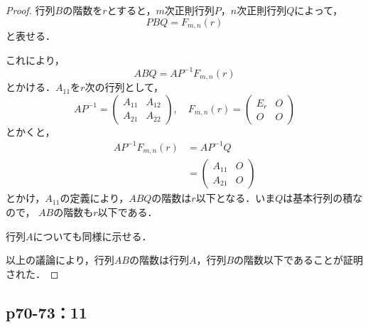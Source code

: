 \documentclass[uplatex,dvipdfmx,a4paper,10pt,fleqn]{jsarticle}
\begin{document}
\begin{leftbar}
    \begin{proof}
        行列$B$の階数を$r$とすると，$m$次正則行列$P$，$n$次正則行列$Q$によって，
        \[
            P B Q = F_{m,n} (r)
        \]
        と表せる．

        これにより，
        \[
            ABQ = A P^{-1} F_{m,n} (r) 
        \]
        とかける．$A_{11}$を$r$次の行列として，
        \[
            A P^{-1} = \begin{pmatrix} A_{11} & A_{12} \\ A_{21} & A_{22} \end{pmatrix}, \quad F_{m,n} (r) = \begin{pmatrix} E_r & O \\ O & O \end{pmatrix}
        \]
        とかくと，
        \begin{align*}
           A P^{-1} F_{m,n} (r)&= A P^{-1} Q \\
           & = \begin{pmatrix} A_{11}& O \\ A_{21} & O \end{pmatrix}
        \end{align*}
        とかけ，$A_{11}$の定義により，$ABQ$の階数は$r$以下となる．いま$Q$は基本行列の積なので， $AB$の階数も$r$以下である．

        行列$A$についても同様に示せる．
        
        以上の議論により，行列$AB$の階数は行列$A$，行列$B$の階数以下であることが証明された．

    \end{proof}
\end{leftbar}

\newpage 


\subsection*{p70-73：11}
\end{document}
